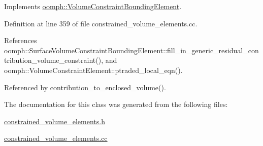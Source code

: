Implements \hyperlink{classoomph_1_1VolumeConstraintBoundingElement_a717f1085709bd8820b8043ff94ecb0c5}{oomph\+::\+Volume\+Constraint\+Bounding\+Element}.



Definition at line 359 of file constrained\+\_\+volume\+\_\+elements.\+cc.



References oomph\+::\+Surface\+Volume\+Constraint\+Bounding\+Element\+::fill\+\_\+in\+\_\+generic\+\_\+residual\+\_\+contribution\+\_\+volume\+\_\+constraint(), and oomph\+::\+Volume\+Constraint\+Element\+::ptraded\+\_\+local\+\_\+eqn().



Referenced by contribution\+\_\+to\+\_\+enclosed\+\_\+volume().



The documentation for this class was generated from the following files\+:\begin{DoxyCompactItemize}
\item 
\hyperlink{constrained__volume__elements_8h}{constrained\+\_\+volume\+\_\+elements.\+h}\item 
\hyperlink{constrained__volume__elements_8cc}{constrained\+\_\+volume\+\_\+elements.\+cc}\end{DoxyCompactItemize}
